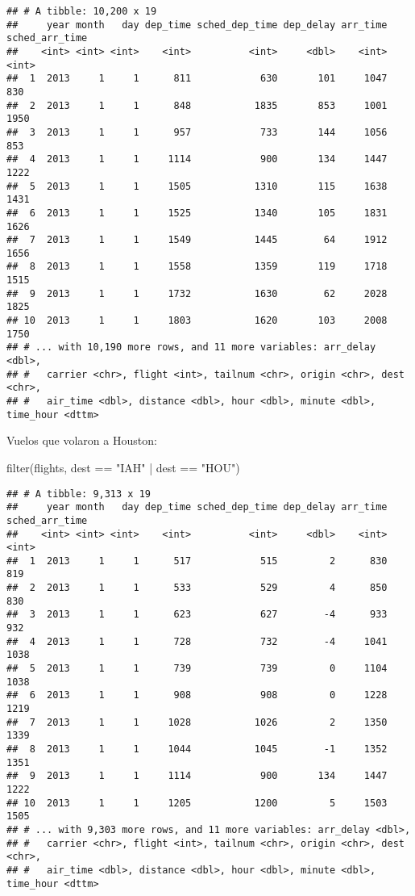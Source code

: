 \documentclass[
]{article}
\newenvironment{Shaded}{\begin{snugshade}}{\end{snugshade}}
\newcommand{\FunctionTok}[1]{\textcolor[rgb]{0.00,0.00,0.00}{#1}}
\newcommand{\NormalTok}[1]{#1}
\newcommand{\SpecialCharTok}[1]{\textcolor[rgb]{0.00,0.00,0.00}{#1}}
\newcommand{\StringTok}[1]{\textcolor[rgb]{0.31,0.60,0.02}{#1}}
\begin{document}
\begin{verbatim}
## # A tibble: 10,200 x 19
##     year month   day dep_time sched_dep_time dep_delay arr_time sched_arr_time
##    <int> <int> <int>    <int>          <int>     <dbl>    <int>          <int>
##  1  2013     1     1      811            630       101     1047            830
##  2  2013     1     1      848           1835       853     1001           1950
##  3  2013     1     1      957            733       144     1056            853
##  4  2013     1     1     1114            900       134     1447           1222
##  5  2013     1     1     1505           1310       115     1638           1431
##  6  2013     1     1     1525           1340       105     1831           1626
##  7  2013     1     1     1549           1445        64     1912           1656
##  8  2013     1     1     1558           1359       119     1718           1515
##  9  2013     1     1     1732           1630        62     2028           1825
## 10  2013     1     1     1803           1620       103     2008           1750
## # ... with 10,190 more rows, and 11 more variables: arr_delay <dbl>,
## #   carrier <chr>, flight <int>, tailnum <chr>, origin <chr>, dest <chr>,
## #   air_time <dbl>, distance <dbl>, hour <dbl>, minute <dbl>, time_hour <dttm>
\end{verbatim}

Vuelos que volaron a Houston:

\begin{Shaded}
\begin{Highlighting}[]
\FunctionTok{filter}\NormalTok{(flights, dest }\SpecialCharTok{==} \StringTok{"IAH"} \SpecialCharTok{|}\NormalTok{ dest }\SpecialCharTok{==} \StringTok{"HOU"}\NormalTok{)}
\end{Highlighting}
\end{Shaded}

\begin{verbatim}
## # A tibble: 9,313 x 19
##     year month   day dep_time sched_dep_time dep_delay arr_time sched_arr_time
##    <int> <int> <int>    <int>          <int>     <dbl>    <int>          <int>
##  1  2013     1     1      517            515         2      830            819
##  2  2013     1     1      533            529         4      850            830
##  3  2013     1     1      623            627        -4      933            932
##  4  2013     1     1      728            732        -4     1041           1038
##  5  2013     1     1      739            739         0     1104           1038
##  6  2013     1     1      908            908         0     1228           1219
##  7  2013     1     1     1028           1026         2     1350           1339
##  8  2013     1     1     1044           1045        -1     1352           1351
##  9  2013     1     1     1114            900       134     1447           1222
## 10  2013     1     1     1205           1200         5     1503           1505
## # ... with 9,303 more rows, and 11 more variables: arr_delay <dbl>,
## #   carrier <chr>, flight <int>, tailnum <chr>, origin <chr>, dest <chr>,
## #   air_time <dbl>, distance <dbl>, hour <dbl>, minute <dbl>, time_hour <dttm>
\end{verbatim}
\end{document}
